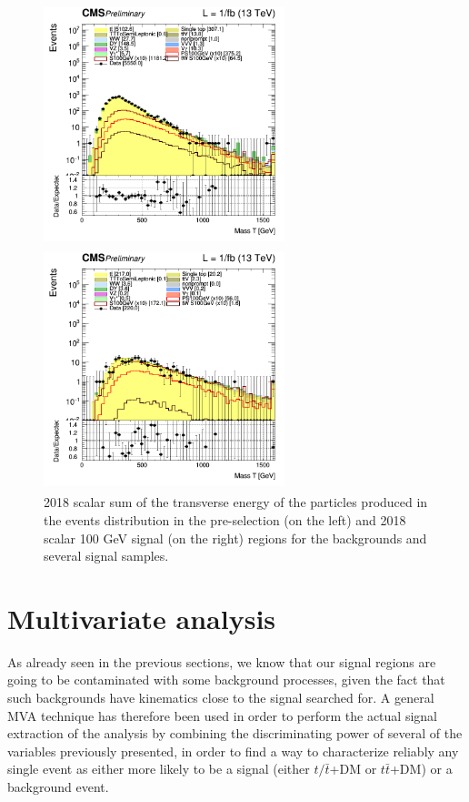 \documentclass[a4paper, 10pt, openright]{report}
\begin{document}
\begin{itemize}
\begin{figure}[htbp]
\centering
\begin{minipage}[b]{.48\textwidth}
\includegraphics[width=7cm, height=7cm]{figs/log_cratio_topCR_ll_2j_signal1_massT.png}
\end{minipage}\hfill
\begin{minipage}[b]{.48\textwidth}
\includegraphics[width=7cm, height=7cm]{figs/log_cratio_topCR_ll_2j_signal0_massT.png}
\end{minipage} \hfill
\caption{2018 scalar sum of the transverse energy of the particles produced in the events distribution in the pre-selection (on the left) and 2018 scalar 100 GeV signal (on the right) regions for the backgrounds and several signal samples.}
\label{fig:SRdisc6}
\end{figure}
\end{itemize}

\section{Multivariate analysis} \label{section:NN}

As already seen in the previous sections, we know that our signal regions are going to be contaminated with some background processes, given the fact that such backgrounds have kinematics close to the signal searched for. A general \acf{MVA} technique has therefore been used in order to perform the actual signal extraction of the analysis by combining the discriminating power of several of the variables previously presented, in order to find a way to characterize reliably any single event as either more likely to be a signal (either $t/\bar t$+DM or $t \bar t$+DM) or a background event.
\end{document}
